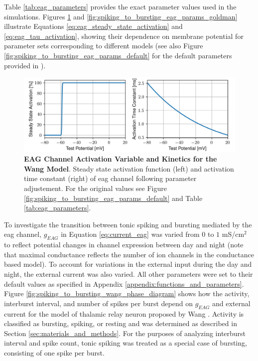 \documentclass[../main.tex]{subfiles}
\begin{document}
Table \ref{tab:eag_parameters} provides the exact parameter values used in the simulations. Figures \ref{fig:spiking_to_bursting_eag_params_wang} and \ref{fig:spiking_to_bursting_eag_params_goldman} illustrate Equations \ref{eq:eag_steady_state_activation} and \ref{eq:eag_tau_activation}, showing their dependence on membrane potential for parameter sets corresponding to different models (see also Figure \ref{fig:spiking_to_bursting_eag_params_default} for the default parameters provided in \parencite{bronkRegulationEagCa22018}).

\begin{figure}[!t]
    \centering
    \includegraphics[width=0.8\linewidth]{../img/spiking_to_bursting/eag_wang.png}
    \caption[EAG Channel Activation Variable and Kinetics for the Wang Model]{
        \textbf{EAG Channel Activation Variable and Kinetics for the Wang Model}. Steady state activation function (left) and activation time constant (right) of \gls{eag} channel following parameter adjustement. For the original values see Figure \ref{fig:spiking_to_bursting_eag_params_default} and Table \ref{tab:eag_parameters}.
    }
    \label{fig:spiking_to_bursting_eag_params_wang}
\end{figure}

To investigate the transition between tonic spiking and bursting mediated by the \gls{eag} channel, $g_{EAG}$ in Equation \ref{eq:current_eag} was varied from $0$ to $1$ mS/cm$^2$ to reflect potential changes in channel expression between day and night (note that maximal conductance reflects the number of ion channels in the conductance based model). To account for variations in the external input during the day and night, the external current was also varied. All other parameters were set to their default values as specified in Appendix \ref{appendix:functions_and_parameters}. Figure \ref{fig:spiking_to_bursting_wang_phase_diagram} shows how the activity, interburst interval, and number of spikes per burst depend on $g_{EAG}$ and external current for the model of thalamic relay neuron proposed by Wang \parencite{wangMultipleDynamicalModes1994}. Activity is classified as bursting, spiking, or resting and was determined as described in Section \ref{sec:materials_and_methods}. For the purposes of analyzing interburst interval and spike count, tonic spiking was treated as a special case of bursting, consisting of one spike per burst.
\end{document}
